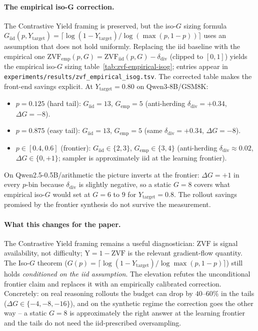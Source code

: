 \documentclass{article}
\begin{document}
\paragraph{The empirical iso-G correction.}
The Contrastive Yield framing is preserved, but the iso-$G$ sizing
formula $G_{\mathrm{iid}}(p, Y_{\mathrm{target}}) = \lceil \log(1 - Y_{\mathrm{target}}) /
\log(\max(p, 1 - p)) \rceil$ uses an assumption that does not hold
uniformly. Replacing the iid baseline with the empirical one
$\mathrm{ZVF}_{\mathrm{emp}}(p, G) = \mathrm{ZVF}_{\mathrm{iid}}(p, G) -
\delta_{\mathrm{div}}$ (clipped to $[0, 1]$) yields the empirical
iso-$G$ sizing table~\ref{tab:zvf-empirical-isog}; entries appear in
\texttt{experiments/results/zvf\_empirical\_isog.tsv}. The corrected
table makes the front-end savings explicit. At
$Y_{\mathrm{target}} = 0.80$ on Qwen3-8B/GSM8K:
\begin{itemize}
\item $p = 0.125$ (hard tail): $G_{\mathrm{iid}} = 13$,
      $G_{\mathrm{emp}} = 5$ (anti-herding $\delta_{\mathrm{div}} = +0.34$, $\Delta G = -8$).
\item $p = 0.875$ (easy tail): $G_{\mathrm{iid}} = 13$,
      $G_{\mathrm{emp}} = 5$ (same $\delta_{\mathrm{div}} = +0.34$, $\Delta G = -8$).
\item $p \in [0.4, 0.6]$ (frontier): $G_{\mathrm{iid}} \in \{2, 3\}$,
      $G_{\mathrm{emp}} \in \{3, 4\}$ (anti-herding $\delta_{\mathrm{div}} \approx 0.02$, $\Delta G \in \{0, +1\}$; sampler is approximately iid at the learning frontier).
\end{itemize}
On Qwen2.5-0.5B/arithmetic the picture inverts at the frontier:
$\Delta G = +1$ in every $p$-bin because $\delta_{\mathrm{div}}$ is
slightly negative, so a static $G = 8$ covers what empirical iso-$G$
would set at $G = 6$ to $9$ for $Y_{\mathrm{target}} = 0.8$. The
rollout savings promised by the frontier synthesis do not survive the
measurement.

\paragraph{What this changes for the paper.}
The Contrastive Yield framing remains a useful diagnostician:
$\mathrm{ZVF}$ is signal availability, not difficulty; $\mathrm{Y} =
1 - \mathrm{ZVF}$ is the relevant gradient-flow quantity. The Iso-$G$
theorem ($G(p) = \lceil \log(1 - Y_{\mathrm{target}}) / \log \max(p, 1 - p) \rceil$)
still holds \emph{conditioned on the iid assumption}. The elevation
refutes the unconditional frontier claim and replaces it with an
empirically calibrated correction. Concretely: on real reasoning
rollouts the budget can drop by $40\text{--}60\%$ in the tails
($\Delta G \in \{-4, -8, -16\}$), and on the synthetic regime the
correction goes the other way -- a static $G = 8$ is approximately
the right answer at the learning frontier and the tails do not need
the iid-prescribed oversampling.
\end{document}
